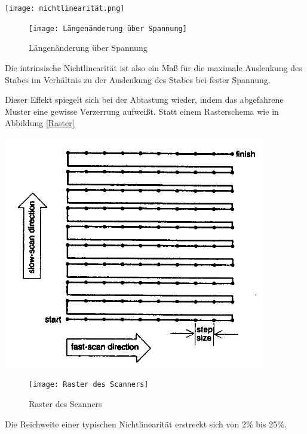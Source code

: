 \texttt{[image: nichtlinearität.png]}
\begin{figure}
	\centering
		\texttt{[image: Längenänderung über Spannung]}
	\caption{Längenänderung über Spannung}
	\label{fig:nichtlinearität}
\end{figure}

\noindent Die intrinsische Nichtlinearität ist also ein Maß für die maximale Auslenkung des Stabes im Verhältnis zu der Auslenkung des Stabes bei fester Spannung. 

\noindent Dieser Effekt spiegelt sich bei der Abtastung wieder, indem das abgefahrene Muster eine gewisse Verzerrung aufweißt. Statt einem Rasterschema wie in Abbildung \ref{Raster}

\includegraphics{raster.png}
\begin{figure}
	\centering
		\texttt{[image: Raster des Scanners]}
	\caption{Raster des Scanners}
	\label{fig:raster}
\end{figure}

\noindent Die Reichweite einer typischen Nichtlinearität erstreckt sich von 2\% bis 25\%.